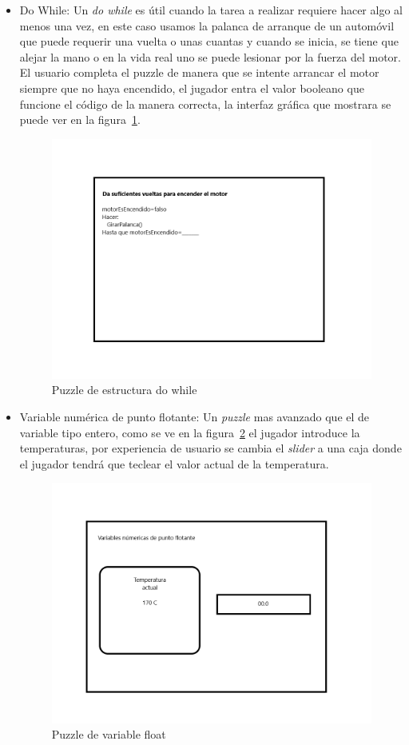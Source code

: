 \begin{itemize}
    \item Do While: Un \textit{do while} es útil cuando la tarea a realizar requiere hacer algo al menos una vez, en este caso usamos la palanca de arranque de un automóvil que puede requerir una vuelta o unas cuantas y cuando se inicia, se tiene que alejar la mano o en la vida real uno se puede lesionar por la fuerza del motor. El usuario completa el puzzle de manera que se intente arrancar el motor siempre que no haya encendido, el jugador entra el valor booleano que funcione el código de la manera correcta, la interfaz gráfica que mostrara se puede ver en la figura~\ref{fig:puzzle_do_while}.
    \begin{figure}[H]
        \centering
        \includegraphics[width=0.5\linewidth]{images/PuzzleDoWhile.png}
        \caption{Puzzle de estructura do while}
        \label{fig:puzzle_do_while}
    \end{figure}
    \item Variable numérica de punto flotante: Un \textit{puzzle} mas avanzado que el de variable tipo entero, como se ve en la figura~\ref{fig:puzzle_float} el jugador introduce la temperaturas, por experiencia de usuario se cambia el \textit{slider} a una caja donde el jugador tendrá que teclear el valor actual de la temperatura.
    \begin{figure}[H]
        \centering
        \includegraphics[width=0.5\linewidth]{images/PuzzleFloat.png}
        \caption{Puzzle de variable float}
        \label{fig:puzzle_float}
    \end{figure}

\end{itemize}
